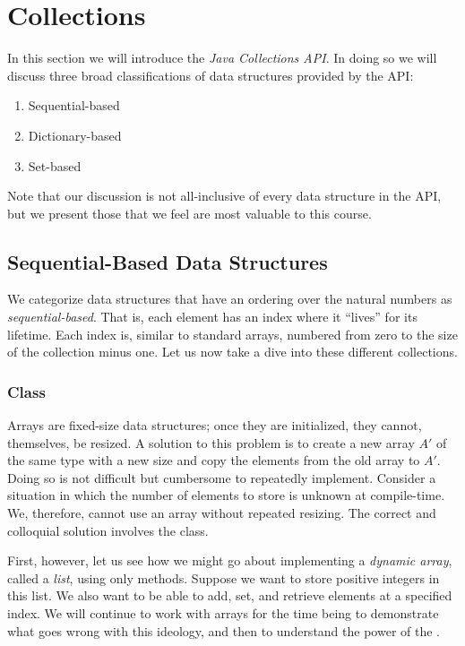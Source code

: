 \section{Collections}
\label{section:chapter-arrays-collections-collections}
In this section we will introduce the \emph{Java Collections API}. In doing so we will discuss three broad classifications of data structures provided by the API:
\begin{enumerate}
    \item Sequential-based
    \item Dictionary-based
    \item Set-based
\end{enumerate}
Note that our discussion is not all-inclusive of every data structure in the API, but we present those that we feel are most valuable to this course.

\subsection{Sequential-Based Data Structures}
We categorize data structures that have an ordering over the natural numbers as \emph{sequential-based}. That is, each element has an index where it ``lives'' for its lifetime. Each index is, similar to standard arrays, numbered from zero to the size of the collection minus one. Let us now take a dive into these different collections.

\subsubsection*{ Class}
Arrays are fixed-size data structures; once they are initialized, they cannot, themselves, be resized. A solution to this problem is to create a new array $A'$ of the same type with a new size and copy the elements from the old array to $A'$. Doing so is not difficult but cumbersome to repeatedly implement. Consider a situation in which the number of elements to store is unknown at compile-time. We, therefore, cannot use an array without repeated resizing. The correct and colloquial solution involves the  class.

First, however, let us see how we might go about implementing a \emph{dynamic array}, called a \emph{list}, using only methods. Suppose we want to store positive integers in this list. We also want to be able to add, set, and retrieve elements at a specified index. We will continue to work with arrays for the time being to demonstrate what goes wrong with this ideology, and then to understand the power of the .

